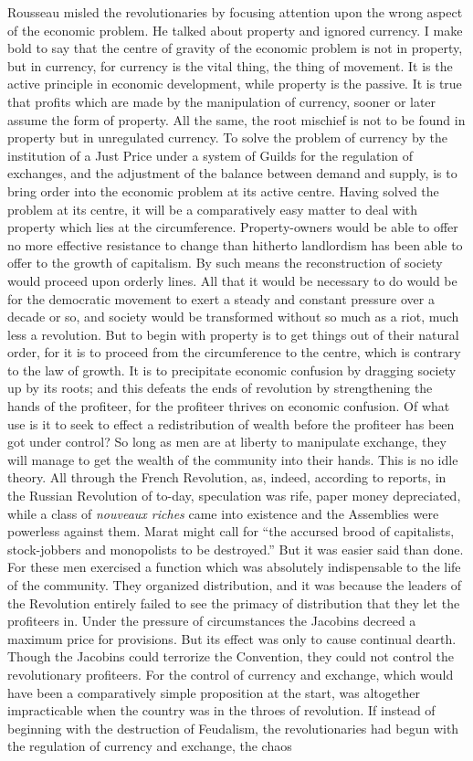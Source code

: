\documentclass{book}
\begin{document}
Rousseau misled the revolutionaries by focusing attention upon the wrong aspect of the economic problem. He talked about property and ignored currency. I make bold to say that the centre of gravity of the economic problem is not in property, but in currency, for currency is the vital thing, the thing of movement. It is the active principle in economic development, while property is the passive. It is true that profits which are made by the manipulation of currency, sooner or later assume the form of property. All the same, the root mischief is not to be found in property but in unregulated currency. To solve the problem of currency by the institution of a Just Price under a system of Guilds for the regulation of exchanges, and the adjustment of the balance between demand and supply, is to bring order into the economic problem at its active centre. Having solved the problem at its centre, it will be a comparatively easy matter to deal with property which lies at the circumference. Property-owners would be able to offer no more effective resistance to change than hitherto landlordism has been able to offer to the growth of capitalism. By such means the reconstruction of society would proceed upon orderly lines. All that it would be necessary to do would be for the democratic movement to exert a steady and constant pressure over a decade or so, and society would be transformed without so much as a riot, much less a revolution. But to begin with property is to get things out of their natural order, for it is to proceed from the circumference to the centre, which is contrary to the law of growth. It is to precipitate economic confusion by dragging society up by its roots; and this defeats the ends of revolution by strengthening the hands of the profiteer, for the profiteer thrives on economic confusion. Of what use is it to seek to effect a redistribution of wealth before the profiteer has been got under control? So long as men are at liberty to manipulate exchange, they will manage to get the wealth of the community into their hands. This is no idle theory. All through the French Revolution, as, indeed, according to reports, in the Russian Revolution of to-day, speculation was rife, paper money depreciated, while a class of \emph{nouveaux riches} came into existence and the Assemblies were powerless against them. Marat might call for “the accursed brood of capitalists, stock-jobbers and monopolists to be destroyed.” But it was easier said than done. For these men exercised a function which was absolutely indispensable to the life of the community. They organized distribution, and it was because the leaders of the Revolution entirely failed to see the primacy of distribution that they let the profiteers in. Under the pressure of circumstances the Jacobins decreed a maximum price for provisions. But its effect was only to cause continual dearth. Though the Jacobins could terrorize the Convention, they could not control the revolutionary profiteers. For the control of currency and exchange, which would have been a comparatively simple proposition at the start, was altogether impracticable when the country was in the throes of revolution. If instead of beginning with the destruction of Feudalism, the revolutionaries had begun with the regulation of currency and exchange, the chaos 
\end{document}
